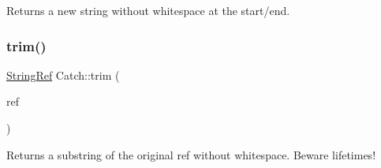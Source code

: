 Returns a new string without whitespace at the start/end. 

\mbox{\label{namespace_catch_a6f6d8ef0349688290bd242b50a702c28}} 
\subsubsection{\texorpdfstring{trim()}{trim()}\hspace{0.1cm}{\footnotesize\ttfamily [2/2]}}
{\footnotesize\ttfamily \mbox{\hyperlink{class_catch_1_1_string_ref}{String\+Ref}} Catch\+::trim (\begin{DoxyParamCaption}\item[{\mbox{\hyperlink{class_catch_1_1_string_ref}{String\+Ref}}}]{ref }\end{DoxyParamCaption})}



Returns a substring of the original ref without whitespace. Beware lifetimes! 

